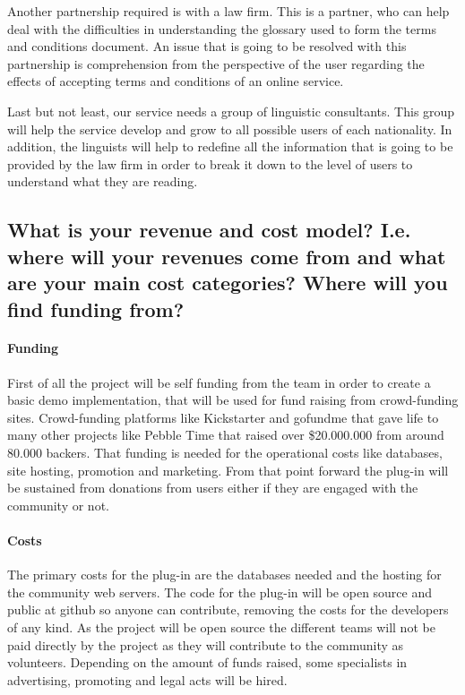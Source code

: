 Another partnership required is with a law firm. This is a partner, who can help 
deal with the difficulties in understanding the glossary used to form the terms 
and conditions document. An issue that is going to be resolved with this 
partnership is comprehension from the perspective of the user regarding the 
effects of accepting  terms and conditions of an online service.

Last but not least, our service needs a group of linguistic consultants. This 
group will help the service develop and grow to all possible users of each 
nationality. In addition, the linguists will help to redefine all the 
information that is going to be provided by the law firm in order to break it 
down to the level of users to understand what they are reading.

\subsection{What is your revenue and cost model? I.e. where will your revenues 
come from and what are your main cost categories? Where will you find funding 
from?}

\paragraph{Funding}
First of all the project will be self funding from the team in order to create a 
basic demo implementation, that will be used for fund raising from crowd-funding 
sites. Crowd-funding platforms like Kickstarter and gofundme that 
gave life to many other projects like Pebble Time that raised over \$20.000.000 
from around 80.000 backers. That funding is needed for the operational costs 
like databases, site hosting, promotion and marketing. From that point forward 
the plug-in will be sustained from donations from users either if they are 
engaged with the community or not.

\paragraph{Costs}
The primary costs for the plug-in are the databases needed and the hosting for 
the community web servers. The code for the plug-in will be open source and 
public at github so anyone can contribute, removing the costs for the developers 
of any kind. As the project will be open source the different teams will not be 
paid directly by the project as they will contribute to the community as 
volunteers. Depending on the amount of funds raised, some specialists in 
advertising, promoting and legal acts will be hired.

